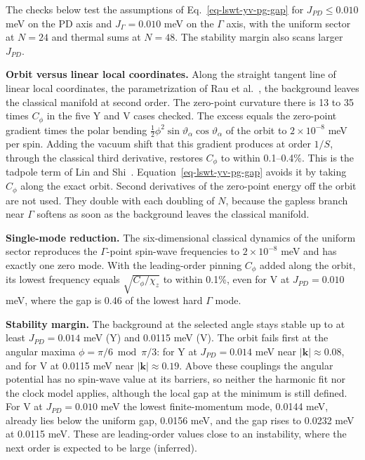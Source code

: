 The checks below test the assumptions of
Eq.~\eqref{eq-lswt-yv-pg-gap} for \(J_{PD}\le0.010\) meV on the PD axis
and \(J_\Gamma=0.010\) meV on the \(\Gamma\) axis, with the uniform
sector at \(N=24\) and thermal sums at \(N=48\). The stability margin
also scans larger \(J_{PD}\).

\textbf{Orbit versus linear local coordinates.} Along the straight
tangent line of linear local coordinates, the parametrization of Rau et
al.~\cite{rau2018}, the background leaves the classical manifold at
second order. The zero-point curvature there is 13 to 35 times
\(C_\phi\) in the five Y and V cases checked. The excess equals the
zero-point gradient times the polar bending
\(\tfrac12\phi^2\sin\vartheta_\alpha\cos\vartheta_\alpha\) of the orbit
to \(2\times10^{-8}\) meV per spin. Adding the vacuum shift that this gradient
produces at order \(1/S\), through the classical third derivative,
restores \(C_\phi\) to within 0.1–0.4\%. This is the tadpole term of
Lin and Shi~\cite{lin2025}. Equation~\eqref{eq-lswt-yv-pg-gap} avoids it
by taking \(C_\phi\) along the exact orbit. Second derivatives of the
zero-point energy off the orbit are not used. They double with each
doubling of \(N\), because the gapless branch near \(\Gamma\) softens as
soon as the background leaves the classical manifold.

\textbf{Single-mode reduction.} The six-dimensional classical dynamics of
the uniform sector reproduces the \(\Gamma\)-point spin-wave frequencies
to \(2\times10^{-8}\) meV and has exactly one zero mode. With the
leading-order pinning \(C_\phi\) added along the orbit, its lowest
frequency equals \(\sqrt{C_\phi/\chi_z}\) to within 0.1\%, even for V at
\(J_{PD}=0.010\) meV, where the gap is 0.46 of the lowest hard
\(\Gamma\) mode.

\textbf{Stability margin.} The background at the selected angle stays
stable up to at least \(J_{PD}=0.014\) meV (Y) and 0.0115 meV (V). The
orbit fails first at the angular maxima \(\phi=\pi/6\bmod\pi/3\): for Y
at \(J_{PD}=0.014\) meV near \(|\mathbf k|\approx0.08\), and for V at
0.0115 meV near \(|\mathbf k|\approx0.19\). Above these couplings the
angular potential has no spin-wave value at its barriers, so neither the
harmonic fit nor the clock model applies, although the local gap at the
minimum is still defined. For V at \(J_{PD}=0.010\) meV the lowest
finite-momentum mode, 0.0144 meV, already lies below the uniform gap,
0.0156 meV, and the gap rises to 0.0232 meV at 0.0115 meV. These are
leading-order values close to an instability, where the next order is
expected to be large (inferred).

